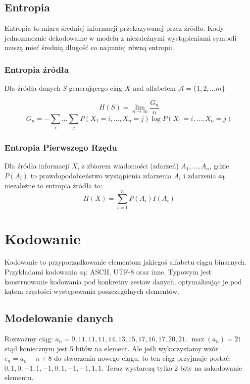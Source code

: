 \documentclass{../notatki}
\begin{document}
\subsection{Entropia}

Entropia to miara średniej informacji przekazywanej przez źródło.
Kody jednoznacznie dekodowalne w modelu z niezależnymi
wystąpieniami symboli muszą mieć średnią długość co najmniej
równą entropii.

\subsubsection{Entropia źródła}

Dla źródła danych $S$ generującego ciąg $X$ nad alfabetem
$\mathcal{A}=\{1, 2, \dots m\}$

$$
H(S) = \lim_{n \to \infty} \frac{G_n}{n}
$$
$$
G_n = - \sum_{i} \dots \sum_{j}P(X_1 = i, \dots, X_n = j) \log P(X_1
= i, \dots, X_n = j)
$$

\subsubsection{Entropia Pierwszego Rzędu}

Dla źródła informacji $X$, z zbiorem wiadomości (zdarzeń) $A_1, \dots, A_n$,
gdzie $P(A_i)$ to prawdopodobieństwo wystąpienia zdarzenia $A_i$ i
zdarzenia są niezależne to entropia źródła to:
$$
H(X) = \sum_{i=1}^{n}P(A_i)I(A_i)
$$

\section{Kodowanie}

Kodowanie to przyporządkowanie elementom jakiegoś alfabetu ciągu binarnych.
Przykładami kodowania są: ASCII, UTF-8 oraz inne. Typowym jest konstruowanie
kodowania pod konkretny zestaw danych, optymalizując je pod kątem częstości
występowania poszczególnych elementów.

\subsection{Modelowanie danych}

Rozważmy ciąg: $a_n=9,11,11,11,14,13,15,17,16,17,20,21$. $\max(a_n)=21$ stąd
koniecznym jest 5 bitów na element. Ale jeśli wykorzystamy wzór
$e_n=a_n - n + 8$ do stworzenia nowego ciągu, to ten ciąg przyjmuje postać:
$0,1,0,-1,1,-1,0,1,-1,-1,1,1$. Teraz wystarczą tylko 2 bity na zakodowanie
elementu.
\end{document}
